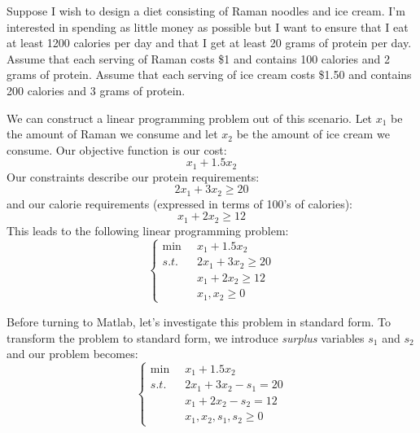 \begin{example} Suppose I wish to design a diet consisting of Raman noodles and ice cream. I'm interested in spending as little money as possible but I want to ensure that I eat at least 1200 calories per day and that I get at least 20 grams of protein per day. Assume that each serving of Raman costs \$1 and contains 100 calories and 2 grams of protein. Assume that each serving of ice cream costs \$1.50 and contains 200 calories and 3 grams of protein. 

We can construct a linear programming problem out of this scenario. Let $x_1$ be the amount of Raman we consume and let $x_2$ be the amount of ice cream we consume. Our objective function is our cost:
\begin{equation}
x_1 + 1.5x_2
\end{equation}
Our constraints describe our protein requirements:
\begin{equation}
2x_1 + 3x_2 \geq 20
\end{equation}
and our calorie requirements (expressed in terms of 100's of calories):
\begin{equation}
x_1 + 2x_2 \geq 12
\end{equation}
This leads to the following linear programming problem:
\begin{equation}
\left\{
\begin{aligned}
\min\;\;& x_1 + 1.5x_2\\
s.t. \;\;& 2x_1 + 3x_2 \geq 20\\
& x_1 + 2x_2 \geq 12\\
&x_1, x_2 \geq 0
\end{aligned}\right.
\end{equation}

Before turning to Matlab, let's investigate this problem in standard form. To transform the problem to standard form, we introduce \textit{surplus} variables $s_1$ and $s_2$ and our problem becomes:
\begin{equation}\left\{
\begin{aligned}
\min\;\;& x_1 + 1.5x_2\\
s.t. \;\;& 2x_1 + 3x_2 - s_1 = 20\\
& x_1 + 2x_2 - s_2 = 12\\
&x_1, x_2,s_1,s_2 \geq 0
\end{aligned}\right.
\end{equation}


\end{example}
